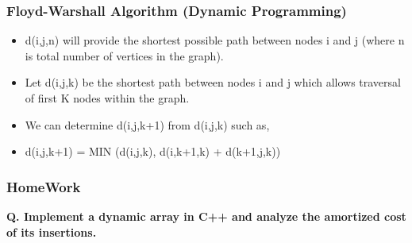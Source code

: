 \documentclass[10pt,aspectratio=43]{beamer}
\begin{document}
\begin{frame}
    \frametitle{\textcolor{myMaroon}{Floyd-Warshall Algorithm (Dynamic Programming)}}
    \begin{itemize}
        \item d(i,j,n) will provide the shortest possible path between nodes i and j (where n is total number of vertices in the graph).

        \vspace{0.4cm}
        \item Let d(i,j,k) be the shortest path between nodes i and j which allows traversal of first K nodes within the graph.

        \vspace{0.4cm}
        \item We can determine d(i,j,k+1) from d(i,j,k) such as,

        \vspace{0.4cm}
        \item
        d(i,j,k+1) = MIN (d(i,j,k), d(i,k+1,k) + d(k+1,j,k))
    \end{itemize}
\end{frame}

\begin{frame}
    \frametitle{\textcolor{myMaroon}HomeWork}

    \begin{center}
        \begin{tcolorbox}[
            colback=gray!10,
            colframe=black!60,
            boxrule=0.5pt,
            width=9.5cm,
            halign=left
        ]
            \small
            \textbf{Q. Implement a dynamic array in C++ and analyze the amortized cost of its insertions.}
        \end{tcolorbox}
    \end{center}

\end{frame}
\end{document}
